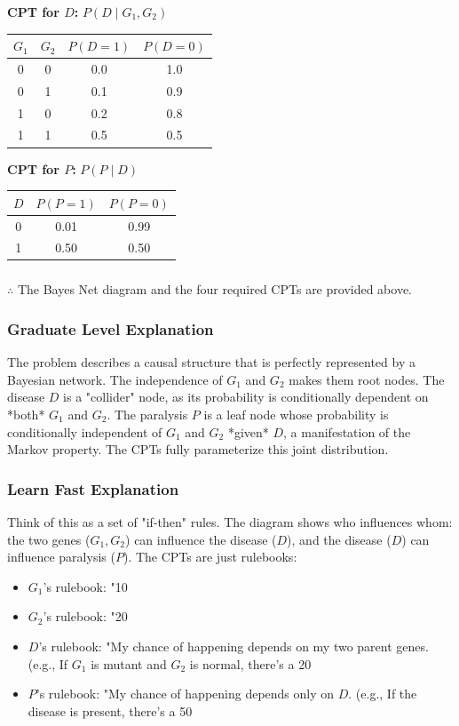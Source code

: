 \documentclass{article}
\begin{document}
\textbf{CPT for $D$:} $P(D \mid G_1, G_2)$
\begin{center}
\begin{tabular}{c c | c c}
\toprule
$G_1$ & $G_2$ & $P(D=1)$ & $P(D=0)$ \\
\midrule
0 & 0 & 0.0 & 1.0 \\
0 & 1 & 0.1 & 0.9 \\
1 & 0 & 0.2 & 0.8 \\
1 & 1 & 0.5 & 0.5 \\
\bottomrule
\end{tabular}
\end{center}

\textbf{CPT for $P$:} $P(P \mid D)$
\begin{center}
\begin{tabular}{c | c c}
\toprule
$D$ & $P(P=1)$ & $P(P=0)$ \\
\midrule
0 & 0.01 & 0.99 \\
1 & 0.50 & 0.50 \\
\bottomrule
\end{tabular}
\end{center}

\subsubsection*{\normalfont}{$\therefore$ The Bayes Net diagram and the four required CPTs are provided above.}

\subsubsection*{Graduate Level Explanation}
The problem describes a causal structure that is perfectly represented by a Bayesian network. The independence of $G_1$ and $G_2$ makes them root nodes. The disease $D$ is a "collider" node, as its probability is conditionally dependent on *both* $G_1$ and $G_2$. The paralysis $P$ is a leaf node whose probability is conditionally independent of $G_1$ and $G_2$ *given* $D$, a manifestation of the Markov property. The CPTs fully parameterize this joint distribution.

\subsubsection*{Learn Fast Explanation}
Think of this as a set of "if-then" rules. The diagram shows who influences whom: the two genes ($G_1, G_2$) can influence the disease ($D$), and the disease ($D$) can influence paralysis ($P$). The CPTs are just rulebooks:
\begin{itemize}
    \item $G_1$'s rulebook: "10%
    \item $G_2$'s rulebook: "20%
    \item $D$'s rulebook: "My chance of happening depends on my two parent genes. (e.g., If $G_1$ is mutant and $G_2$ is normal, there's a 20%
    \item $P$'s rulebook: "My chance of happening depends only on $D$. (e.g., If the disease is present, there's a 50%
\end{itemize}
\end{document}

